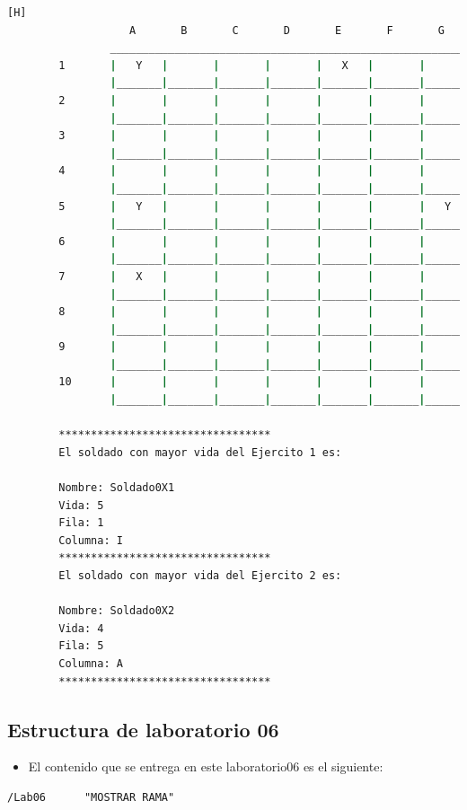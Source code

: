 \documentclass{article}
\begin{document}
\begin{lstlisting}[language=bash,caption={La ejecución: \textcolor{red}{PARA PODER VER LA TABLA COMPLETAMENTE MIRAR LA PLANTILLA DE LATEX O EJECUTARLO: }}][H]
				   A       B       C       D       E       F       G       H       I       J
				_________________________________________________________________________________
		1       |   Y   |       |       |       |   X   |       |       |       |   X   |       |
				|_______|_______|_______|_______|_______|_______|_______|_______|_______|_______|
		2       |       |       |       |       |       |       |       |       |       |       |
				|_______|_______|_______|_______|_______|_______|_______|_______|_______|_______|
		3       |       |       |       |       |       |       |       |       |       |       |
				|_______|_______|_______|_______|_______|_______|_______|_______|_______|_______|
		4       |       |       |       |       |       |       |       |       |       |       |
				|_______|_______|_______|_______|_______|_______|_______|_______|_______|_______|
		5       |   Y   |       |       |       |       |       |   Y   |       |       |       |
				|_______|_______|_______|_______|_______|_______|_______|_______|_______|_______|
		6       |       |       |       |       |       |       |       |   X   |       |       |
				|_______|_______|_______|_______|_______|_______|_______|_______|_______|_______|
		7       |   X   |       |       |       |       |       |       |       |       |       |
				|_______|_______|_______|_______|_______|_______|_______|_______|_______|_______|
		8       |       |       |       |       |       |       |       |       |       |       |
				|_______|_______|_______|_______|_______|_______|_______|_______|_______|_______|
		9       |       |       |       |       |       |       |       |       |       |       |
				|_______|_______|_______|_______|_______|_______|_______|_______|_______|_______|
		10      |       |       |       |       |       |       |       |       |       |   Y   |
				|_______|_______|_______|_______|_______|_______|_______|_______|_______|_______|
		
		*********************************
		El soldado con mayor vida del Ejercito 1 es: 
		
		Nombre: Soldado0X1
		Vida: 5
		Fila: 1
		Columna: I
		*********************************
		El soldado con mayor vida del Ejercito 2 es: 
		
		Nombre: Soldado0X2
		Vida: 4
		Fila: 5
		Columna: A
		*********************************
	\end{lstlisting}
	\subsection{Estructura de laboratorio 06}
	\begin{itemize}	
		\item El contenido que se entrega en este laboratorio06 es el siguiente:
	\end{itemize}
	\begin{lstlisting}[style=ascii-tree]
	/Lab06		"MOSTRAR RAMA"
	\end{lstlisting}    
\end{document}
